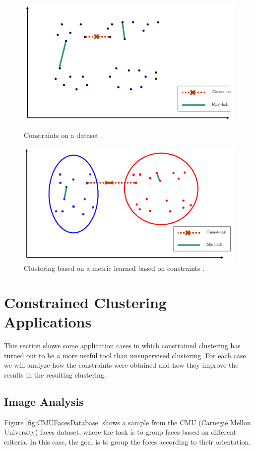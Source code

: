 \begin{figure}[bth]
	\myfloatalign
	{\includegraphics[width=.6\linewidth]{gfx/ConstClust/InputInstancesAndConst2}
	\caption[Constraints on a dataset.]{Constraints on a dataset \cite{davidson2007survey}.} \label{fig:ConstOverDataset2}
	}
	{\includegraphics[width=.6\linewidth]{gfx/ConstClust/MetricaAprendida}
	\caption[Clustering based on a metric learned based on constraints.]{Clustering based on a metric learned based on constraints \cite{davidson2007survey}.} \label{fig:MetricLearned}
	}
\end{figure}

\section{Constrained Clustering Applications} \label{sec:CCApplications}

This section shows some application cases in which constrained clustering has turned out to be a more useful tool than unsupervised clustering. For each case we will analyze how the constraints were obtained and how they improve the results in the resulting clustering. 

\subsection{Image Analysis}

Figure \ref{fig:CMUFacesDatabase} shows a sample from the CMU (Carnegie Mellon University) faces dataset, where the task is to group faces based on different criteria. In this case, the goal is to group the faces according to their orientation.

